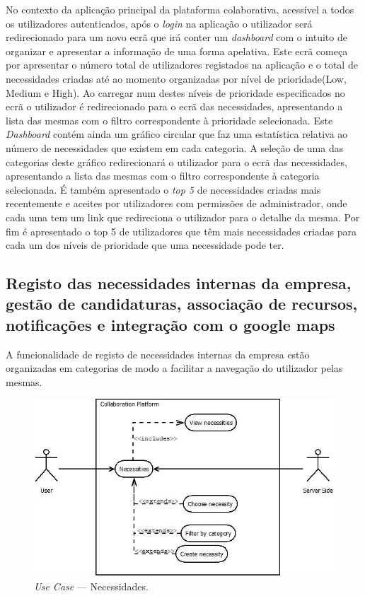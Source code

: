 No contexto da aplicação principal da plataforma colaborativa, acessível a todos os utilizadores autenticados, após o \textit{login} na aplicação o utilizador será redirecionado para um novo ecrã que irá conter um \textit{dashboard} com o intuito de organizar e 
apresentar a informação de uma forma apelativa. Este ecrã começa por apresentar o número total de utilizadores registados na aplicação e o total de necessidades criadas até ao momento organizadas por nível de prioridade(Low, Medium e High). 
Ao carregar num destes níveis de prioridade especificados no ecrã o utilizador é redirecionado para o ecrã das necessidades, apresentando a lista das mesmas com o filtro correspondente à prioridade selecionada. 
Este \textit{Dashboard} contém ainda um gráfico circular que faz uma estatística relativa ao número de necessidades que existem em cada categoria. A seleção de uma das categorias deste gráfico redirecionará o utilizador para o ecrã das necessidades, apresentando a lista das mesmas com o filtro correspondente à categoria selecionada.
É também apresentado o \textit{top 5} de necessidades criadas mais recentemente e aceites por utilizadores com permissões de administrador, onde cada uma tem um link que redireciona o utilizador para o detalhe da mesma. 
Por fim é apresentado o top 5 de utilizadores que têm mais necessidades criadas para cada um dos níveis de prioridade que uma necessidade pode ter.

\subsection{Registo das necessidades internas da empresa, gestão de candidaturas, associação de recursos, notificações e integração com o google maps}\label{subsec:necessitiesCandidatesNotificationsGoogleMaps}

A funcionalidade de registo de necessidades internas da empresa estão organizadas em categorias de modo a facilitar a navegação do utilizador pelas mesmas.

\begin{figure}[H]
    \centering
    \includegraphics[scale=0.6]{figures/Necessities.jpeg}
    \caption{\textit{Use Case} --- Necessidades.}\label{fig:uc:necessities}
\end{figure}


